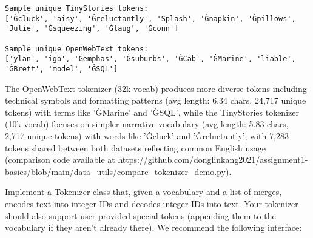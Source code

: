 \begin{enumerate}[label=(\alph*)]
\begin{lstlisting}
Sample unique TinyStories tokens:
['Ġcluck', 'aisy', 'Ġreluctantly', 'Splash', 'Ġnapkin', 'Ġpillows', 'Julie', 'Ġsqueezing', 'Ġlaug', 'Ġconn']

Sample unique OpenWebText tokens:
['ylan', 'igo', 'Ġemphas', 'Ġsuburbs', 'ĠCab', 'ĠMarine', 'liable', 'ĠBrett', 'model', 'ĠSQL']
    \end{lstlisting}
    \begin{answer}
    The OpenWebText tokenizer (32k vocab) produces more diverse tokens including technical symbols and formatting patterns (avg length: 6.34 chars, 24,717 unique tokens) with terms like 'ĠMarine' and 'ĠSQL', while the TinyStories tokenizer (10k vocab) focuses on simpler narrative vocabulary (avg length: 5.83 chars, 2,717 unique tokens) with words like 'Ġcluck' and 'Ġreluctantly', with 7,283 tokens shared between both datasets reflecting common English usage (comparison code available at \url{https://github.com/donglinkang2021/assignment1-basics/blob/main/data_utils/compare_tokenizer_demo.py}).
    \end{answer}
\end{enumerate}



Implement a Tokenizer class that, given a vocabulary and a list of merges, encodes text into integer IDs and decodes integer IDs into text. Your tokenizer should also support user-provided special tokens (appending them to the vocabulary if they aren't already there). We recommend the following interface:

